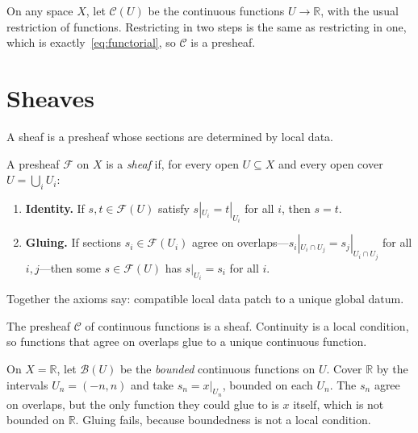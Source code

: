 \begin{example}
  \label{ex:cont}
  On any space $X$, let $\mathcal{C}(U)$ be the continuous functions
  $U \to \mathbb{R}$, with the usual restriction of functions.
  Restricting in two steps is the same as restricting in one, which is
  exactly~\eqref{eq:functorial}, so $\mathcal{C}$ is a presheaf.
\end{example}

\section{Sheaves}
\label{sec:sheaves-def}

A sheaf is a presheaf whose sections are determined by local data.

\begin{definition}[Sheaf]
  \label{def:sheaf}
  A presheaf $\mathcal{F}$ on $X$ is a \emph{sheaf} if, for every open
  $U \subseteq X$ and every open cover $U = \bigcup_i U_i$:
  \begin{enumerate}
    \item \textbf{Identity.} If $s, t \in \mathcal{F}(U)$ satisfy
          $s|_{U_i} = t|_{U_i}$ for all $i$, then $s = t$.
    \item \textbf{Gluing.} If sections $s_i \in \mathcal{F}(U_i)$ agree
          on overlaps---$s_i|_{U_i \cap U_j} = s_j|_{U_i \cap U_j}$ for
          all $i, j$---then some $s \in \mathcal{F}(U)$ has
          $s|_{U_i} = s_i$ for all $i$.
  \end{enumerate}
\end{definition}

Together the axioms say: compatible local data patch to a unique global
datum.

\begin{example}
  \label{ex:contsheaf}
  The presheaf $\mathcal{C}$ of continuous functions is a sheaf.
  Continuity is a local condition, so functions that agree on overlaps
  glue to a unique continuous function.
\end{example}

\begin{example}
  \label{ex:bounded}
  On $X = \mathbb{R}$, let $\mathcal{B}(U)$ be the \emph{bounded}
  continuous functions on $U$. Cover $\mathbb{R}$ by the intervals
  $U_n = (-n, n)$ and take $s_n = x|_{U_n}$, bounded on each $U_n$. The
  $s_n$ agree on overlaps, but the only function they could glue to is
  $x$ itself, which is not bounded on $\mathbb{R}$. Gluing fails,
  because boundedness is not a local condition.
\end{example}

